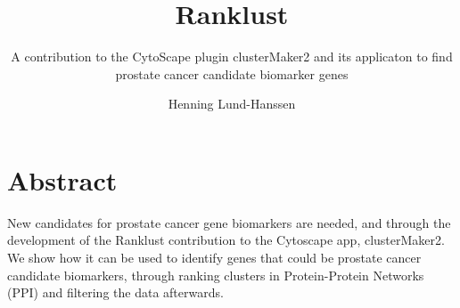 \documentclass[a4paper,UKenglish]{ifimaster}
\title{Ranklust}
\subtitle{A contribution to the CytoScape plugin clusterMaker2 and its applicaton to find prostate cancer candidate biomarker genes}
\author{Henning Lund-Hanssen}
\begin{document}
\duoforside[program={Programming and Networks},
    dept={Department of Informatics},long]

\frontmatter{}

\setlength{\parskip}{12pt}
\setlength{\parindent}{12pt}

\chapter*{Abstract}
New candidates for prostate cancer gene biomarkers are needed, and through the
development of the Ranklust contribution to the Cytoscape app, clusterMaker2. We
show how it can be used to identify genes that could be prostate cancer
candidate biomarkers, through ranking clusters in Protein-Protein Networks
(PPI) and filtering the data afterwards.

\tableofcontents{}
\listoffigures{}
\listoftables{}

\mainmatter{}










\backmatter{}
\printbibliography
\end{document}
